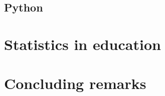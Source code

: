 \documentclass[fleqn,10pt]{SelfArx} %
\begin{document}
\subsection*{Python}

\section*{Statistics in education}

\section*{Concluding remarks}


\printbibliography

\end{document}

